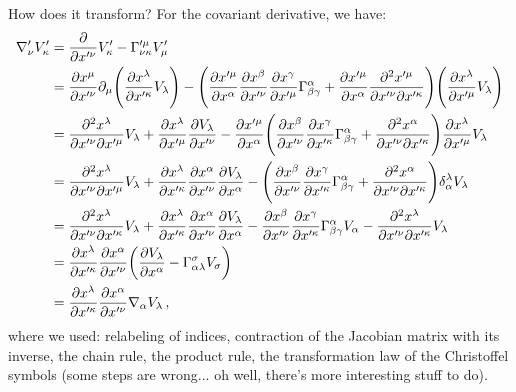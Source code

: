 \documentclass[main.tex]{subfiles}
\begin{document}
How does it transform? For the covariant derivative, we have:
%
\begin{subequations}
\begin{align}
  \nabla_{\nu }' V_{\kappa }' &= \pdv{}{x^{\prime \nu }} V'_\kappa - \Gamma^{\prime \mu }_{\nu \kappa } V_{\mu  }'  \\
  &= \pdv{x^{\mu }}{x^{\prime \nu }} \partial_{\mu } \qty(\pdv{x^{\lambda }}{x^{\prime \kappa}}V_{\lambda }) -  \qty(\pdv{x^{\prime \mu }}{x^{\alpha }} \pdv{x^{\beta }}{x^{\prime \nu }} \pdv{x^{\gamma }}{x^{\prime \mu }} \Gamma^{\alpha }_{\beta \gamma } + 
  \pdv{x^{\prime \mu }}{x^{\alpha }} \pdv[2]{x^{\prime \mu }}{x^{\prime \nu }}{x^{\prime \kappa }} ) 
  \qty(\pdv{x^{\lambda }}{x^{\prime \mu }} V_{\lambda })  \\
  &= \pdv[2]{x^{\lambda }}{x^{\prime \nu }}{x^{\prime \mu }} V_{\lambda }
  + \pdv{x^{\lambda }}{x^{\prime \mu}} \pdv{V_{\lambda }}{x^{\prime \nu }} - 
  \pdv{x^{\prime \mu }}{x^{\alpha }} \qty(\pdv{x^{\beta }}{x^{\prime \nu }}\pdv{x^{\gamma }}{x^{\prime \kappa }} \Gamma^{\alpha }_{\beta \gamma }  + \pdv[2]{x^{\alpha }}{x^{\prime \nu }}{x^{\prime \kappa }} ) \pdv{x^{\lambda }}{x^{\prime \mu }} V_{\lambda }   \\
  &=\pdv[2]{x^{\lambda }}{x^{\prime \nu }}{x^{\prime \mu }} V_{\lambda }
  + \pdv{x^{\lambda }}{x^{\prime \kappa }} \pdv{x^{\alpha }}{x^{\prime \nu }} \pdv{V_{\lambda } }{x^{\alpha }}
  - \qty(\pdv{x^{\beta }}{x^{\prime \nu }}\pdv{x^{\gamma }}{x^{\prime \kappa }} \Gamma^{\alpha }_{\beta \gamma }  + \pdv[2]{x^{\alpha }}{x^{\prime \nu }}{x^{\prime \kappa }} ) \delta^{\lambda }_{\alpha }V_{\lambda }   \\
  &= \pdv[2]{x^{\lambda }}{x^{\prime \nu }}{x^{\prime \kappa }} V_{\lambda } 
  + \pdv{x^{\lambda }}{x^{\prime \kappa }} \pdv{x^{\alpha }}{x^{\prime \nu }} \pdv{V_{\lambda } }{x^{\alpha }}
  - \pdv{x^{\beta }}{x^{\prime \nu }} \pdv{x^{\gamma }}{x^{\prime \kappa }} \Gamma^{\alpha }_{\beta \gamma }V_{\alpha }
  -\pdv[2]{x^{\lambda }}{x^{\prime \nu }}{x^{\prime \kappa }} V_{\lambda }   \\
  &= \pdv{x^{\lambda }}{x^{\prime \kappa }} \pdv{x^{\alpha }}{x^{\prime \nu }}
  \qty(\pdv{V_{\lambda }}{x^{\alpha } } - \Gamma^{\sigma }_{\alpha \lambda }V_{\sigma })  \\
  &= \pdv{x^{\lambda }}{x^{\prime \kappa }} \pdv{x^{\alpha }}{x^{\prime \nu }}
  \nabla_{\alpha }V_{\lambda }
  \,,
\end{align}
\end{subequations}
%
where we used: relabeling of indices, contraction of the Jacobian matrix with its inverse, the chain rule, the product rule, the transformation law of the Christoffel symbols (some steps are wrong... oh well, there's more interesting stuff to do).
\end{document}
